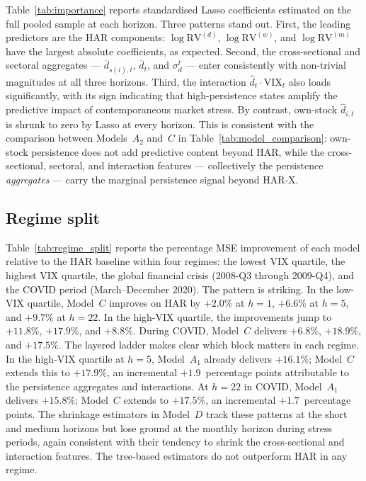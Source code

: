 \documentclass[11pt,a4paper]{article}
\newcommand{\RV}{\mathrm{RV}}
\newcommand{\VIX}{\mathrm{VIX}}
\newcommand{\dhat}{\hat d}
\begin{document}
Table~\ref{tab:importance} reports standardised Lasso coefficients
estimated on the full pooled sample at each horizon. Three patterns
stand out. First, the leading predictors are the HAR components:
$\log\RV^{(d)}$, $\log\RV^{(w)}$, and $\log\RV^{(m)}$ have the largest
absolute coefficients, as expected. Second, the cross-sectional and
sectoral aggregates --- $\overline d_{s(i),t}$, $\overline d_t$, and
$\sigma_d^t$ --- enter consistently with non-trivial magnitudes at all
three horizons. Third, the interaction $\dhat_t\!\cdot\!\VIX_t$ also
loads significantly, with its sign indicating that high-persistence
states amplify the predictive impact of contemporaneous market stress.
By contrast, own-stock $\dhat_{i,t}$ is shrunk to zero by Lasso at every
horizon. This is consistent with the comparison between Models~$A_2$
and~$C$ in Table~\ref{tab:model_comparison}: own-stock persistence does
not add predictive content beyond HAR, while the cross-sectional,
sectoral, and interaction features --- collectively the persistence
\emph{aggregates} --- carry the marginal persistence signal beyond
HAR-X.



\subsection{Regime split}
\label{subsec:regimes}

Table~\ref{tab:regime_split} reports the percentage MSE improvement of
each model relative to the HAR baseline within four regimes: the lowest
VIX quartile, the highest VIX quartile, the global financial crisis
(2008-Q3 through 2009-Q4), and the COVID period (March--December 2020).
The pattern is striking. In the low-VIX quartile, Model~$C$ improves on
HAR by $+2.0\%$ at $h=1$, $+6.6\%$ at $h=5$, and $+9.7\%$ at $h=22$.
In the high-VIX quartile, the improvements jump to $+11.8\%$,
$+17.9\%$, and $+8.8\%$. During COVID, Model~$C$ delivers $+6.8\%$,
$+18.9\%$, and $+17.5\%$. The layered ladder makes clear which block
matters in each regime. In the high-VIX quartile at $h=5$, Model~$A_1$
already delivers $+16.1\%$; Model~$C$ extends this to $+17.9\%$, an
incremental $+1.9$~percentage points attributable to the persistence
aggregates and interactions. At $h=22$ in COVID, Model~$A_1$ delivers
$+15.8\%$; Model~$C$ extends to $+17.5\%$, an incremental
$+1.7$~percentage points. The shrinkage estimators in Model~$D$ track
these patterns at the short and medium horizons but lose ground at the
monthly horizon during stress periods, again consistent with their
tendency to shrink the cross-sectional and interaction features. The
tree-based estimators do not outperform HAR in any regime.
\end{document}
